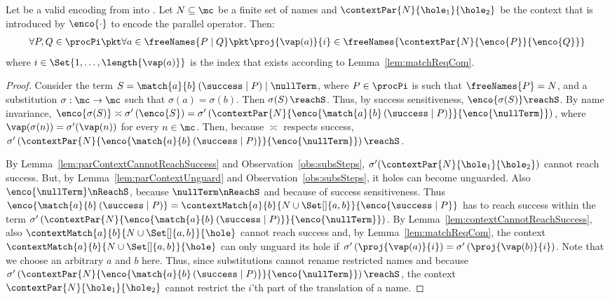 \documentclass[]{article}
\begin{document}
\begin{lemma}
	\label{lem:parContextNotRes}
	Let \encod be a valid encoding from \piT into \piNM.
	Let $ N \subseteq \mc $ be a finite set of names
	and $ \contextPar{N}{\hole_1}{\hole_2} $ be the context that is introduced by $ \enco{\cdot} $ to encode the parallel operator.
	Then:
	\begin{align*}
		\forall P, Q \in \procPi \pkt \forall a \in \freeNames{P \mid Q} \pkt \proj{\vap\!\left( a \right)}{i} \in \freeNames{\contextPar{N}{\enco{P}}{\enco{Q}}}
	\end{align*}
	where $ i \in \Set{ 1, \ldots, \length{\vap\!\left( a \right)} } $ is the index that exists according to Lemma~\ref{lem:matchReqCom}.
\end{lemma}

\begin{proof}
	Consider the term $ S = \match{a}{b}\left( \success \mid P \right) \mid \nullTerm $, where $ P \in \procPi $ is such that $ \freeNames{P} = N $, and a substitution $ \sigma : \mc \to \mc $ such that $ \sigma\!\left( a \right) = \sigma\!\left( b \right) $.
	Then $ \sigma\!\left( S \right) \reachS $. Thus, by success sensitiveness, $ \enco{ \sigma\!\left( S \right) } \reachS $.
	By name invariance, $ \enco{ \sigma\!\left( S \right) } \asymp \sigma'\left( \enco{S} \right) = \sigma'\left( \contextPar{N}{\enco{\match{a}{b}\left( \success \mid P \right)}}{\enco{\nullTerm}} \right) $, where $ \vap\!\left( \sigma\!\left( n \right) \right) = \sigma'\!\left( \vap\!\left( n \right) \right) $ for every $ n \in \mc $.
	Then, because $ \asymp $ respects success, $ \sigma'\left( \contextPar{N}{\enco{\match{a}{b}\left( \success \mid P \right)}}{\enco{\nullTerm}} \right) \reachS $.
	
	By Lemma~\ref{lem:parContextCannotReachSuccess} and Observation~\ref{obs:subsSteps}, $ \sigma'\!\left( \contextPar{N}{\hole_1}{\hole_2} \right) $ cannot reach success. But, by Lemma~\ref{lem:parContextUnguard} and Observation~\ref{obs:subsSteps}, it holes can become unguarded. Also $ \enco{\nullTerm} \nReachS $, because $ \nullTerm \nReachS $ and because of success sensitiveness.
	Thus $ \enco{\match{a}{b}\left( \success \mid P \right)} = \contextMatch{a}{b}{N \cup \Set[]{ a, b }}{\enco{\success \mid P}} $ has to reach success within the term $ \sigma'\left( \contextPar{N}{\enco{\match{a}{b}\left( \success \mid P \right)}}{\enco{\nullTerm}} \right) $.
	By Lemma~\ref{lem:contextCannotReachSuccess}, also $ \contextMatch{a}{b}{N \cup \Set[]{ a, b }}{\hole} $ cannot reach success and, by Lemma~\ref{lem:matchReqCom}, the context $ \contextMatch{a}{b}{N \cup \Set[]{ a, b }}{\hole} $ can only unguard its hole if $ \sigma'\left( \proj{\vap\!\left( a \right)}{i} \right) = \sigma'\left( \proj{\vap\!\left( b \right)}{i} \right) $. Note that we choose an arbitrary $ a $ and $ b $ here. Thus, since substitutions cannot rename restricted names and because $ \sigma'\left( \contextPar{N}{\enco{\match{a}{b}\left( \success \mid P \right)}}{\enco{\nullTerm}} \right) \reachS $, the context $ \contextPar{N}{\hole_1}{\hole_2} $ cannot restrict the $ i $'th part of the translation of a name.
\end{proof}
\end{document}
